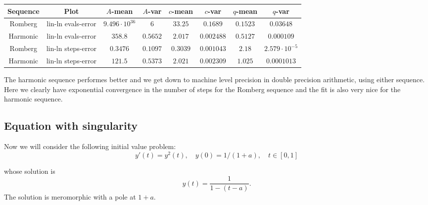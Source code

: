 \begin{table}[H]
    \centering
    \small
     \begin{tabular}{c|c||c|c|c|c|c|c}
Sequence & Plot & \(A\)-mean & \(A\)-var & \(c\)-mean & \(c\)-var & \(q\)-mean & \(q\)-var\\\hline
Romberg & lin-ln evals-error & \(9.496\cdot 10^{36}\) & \(6\) & \(33.25\) & \(0.1689\) & \(0.1523\) & \(0.03648\) \\
Harmonic & lin-ln evals-error & \(358.8\) & \(0.5652\) & \(2.017\) & \(0.002488\) & \(0.5127\) & \(0.000109\) \\
Romberg & lin-ln steps-error & \(0.3476\) & \(0.1097\) & \(0.3039\) & \(0.001043\) & \(2.18\) & \(2.579\cdot 10^{-5}\) \\
Harmonic & lin-ln steps-error & \(121.5\) & \(0.5373\) & \(2.021\) & \(0.002309\) & \(1.025\) & \(0.0001013\) \\
    \end{tabular}
    \label{tab:my_label}
\end{table}

The harmonic sequence performes better and we get down to machine level precision in double precision arithmetic, using either sequence.\\

Here we clearly have exponential convergence in the number of steps for the Romberg sequence and the fit is also very nice for the harmonic sequence.

\subsection{Equation with singularity}

Now we will consider the following initial value problem:
\begin{equation}\label{46}
y'(t) = y^2(t),\quad y(0) = 1/(1+a), \quad t\in [0,1]
\end{equation}

whose solution is 
\[
y(t) = \frac{1}{1-(t-a)}.
\]
The solution is meromorphic with a pole at \(1+a\).

